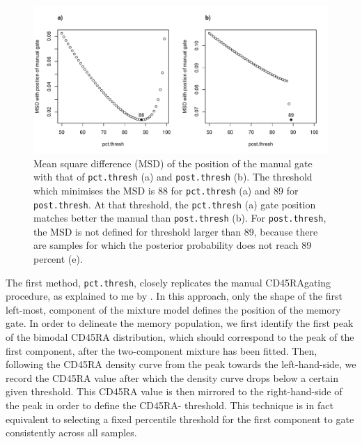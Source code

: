 \begin{figure}[h]
\centering
  \includegraphics[width=\textwidth]{figures/cd45ra-gate-agreement.pdf}
{ Mean square difference (MSD) of the position of the manual gate with that of \texttt{pct.thresh} (a) and \texttt{post.thresh} (b). }
{
  The threshold which minimises the MSD is 88 for \texttt{pct.thresh} (a) and 89 for \texttt{post.thresh}.
  At that threshold, the \texttt{pct.thresh} (a) gate position matches better the manual than \texttt{post.thresh} (b).
  For \texttt{post.thresh}, the MSD is not defined for threshold larger than 89,
  because there are samples for which the posterior probability does not reach 89 percent (e).
}
\end{figure}


The first method, \texttt{pct.thresh}, closely replicates the manual CD45RA\negative gating procedure, as explained to me by .
In this approach, only the shape of the first left-most, component of the mixture model defines the position of the \negative memory gate.
In order to delineate the memory population, we first identify the first peak of the bimodal CD45RA distribution,
which should correspond to the peak of the first component, after the two-component mixture has been fitted.
Then, following the CD45RA density curve from the peak towards the left-hand-side,
we record the CD45RA value after which the density curve drops below a certain given threshold.
This CD45RA value is then mirrored to the right-hand-side of the peak in order to define the CD45RA- threshold.
This technique is in fact equivalent to selecting a fixed percentile threshold
for the first component to gate consistently across all samples.

